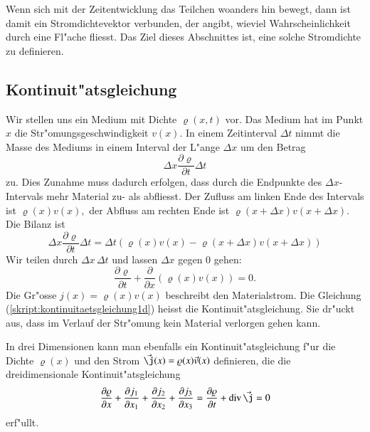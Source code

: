 Wenn sich mit der Zeitentwicklung das Teilchen woanders hin bewegt,
dann ist damit ein Stromdichtevektor verbunden, der angibt, 
wieviel Wahrscheinlichkeit durch eine Fl"ache fliesst.
Das Ziel dieses Abschnittes ist, eine solche Stromdichte zu
definieren.

\subsection{Kontinuit"atsgleichung}
Wir stellen uns ein Medium mit Dichte $\varrho(x,t)$ vor.
Das Medium hat im Punkt $x$ die Str"omungsgeschwindigkeit $v(x)$.
In einem Zeitinterval $\Delta t$ nimmt die Masse des Mediums
in einem Interval der L"ange $\Delta x$ um den Betrag
\[
\Delta x\frac{\partial\varrho}{\partial t}\Delta t
\]
zu.
Dies Zunahme muss dadurch erfolgen, dass durch die Endpunkte
des $\Delta x$-Intervals mehr Material zu- als abfliesst.
Der Zufluss am linken Ende des Intervals ist
$
\varrho(x) v(x),
$
der Abfluss am rechten Ende ist $\varrho(x+\Delta x)v(x+\Delta x)$.
Die Bilanz ist
\[
\Delta x\frac{\partial\varrho}{\partial t}\Delta t
=
\Delta t(
\varrho(x) v(x)
-
\varrho(x+\Delta x) v(x+\Delta x)
)
\]
Wir teilen durch $\Delta x\,\Delta t$ und lassen $\Delta x$ gegen 0 gehen:
\begin{equation}
\frac{\partial\varrho}{\partial t}
+\frac{\partial}{\partial x}(\varrho(x)v(x))
=0.
\label{skript:kontinuitaetsgleichung1d}
\end{equation}
Die Gr"osse $j(x)=\varrho(x)v(x)$ beschreibt den Materialstrom.
Die Gleichung (\ref{skript:kontinuitaetsgleichung1d}) heisst die
Kontinuit"atsgleichung.
Sie dr"uckt aus, dass im Verlauf der Str"omung kein Material verlorgen
gehen kann.

In drei Dimensionen kann man ebenfalls ein Kontinuit"atsgleichung
f"ur die Dichte $\varrho(x)$ und den Strom $\vec\j(x)=\varrho(x) \vec v(x)$
definieren, die die dreidimensionale 
Kontinuit"atsgleichung
\[
\frac{\partial\varrho}{\partial x}
+
\frac{\partial j_1}{\partial x_1}
+
\frac{\partial j_2}{\partial x_2}
+
\frac{\partial j_3}{\partial x_3}
=
\frac{\partial\varrho}{\partial t}+\operatorname{div}\vec\j
=0
\]
erf"ullt.

